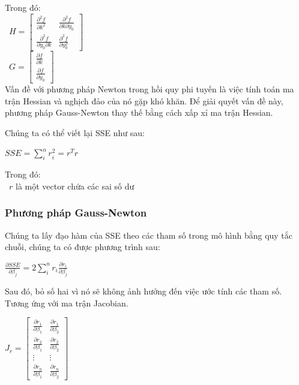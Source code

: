 \documentclass[conference]{IEEEtran}
\begin{document}
Trong đó: \\
\indent\textbullet\ \(H = \begin{bmatrix}
    \frac{\partial^2 f}{\partial k^2}            & \frac{\partial^2 f}{\partial k \partial y_0} \\
    \frac{\partial^2 f}{\partial y_0 \partial k} & \frac{\partial^2 f}{\partial y_0^2}
\end{bmatrix}\)\\
\indent\textbullet\ \(G = \begin{bmatrix}
    \frac{\partial f}{\partial k} \\ \frac{\partial f}{\partial y_0}
\end{bmatrix}\)\\

Vấn đề với phương pháp Newton trong hồi quy phi tuyến là việc tính toán ma trận Hessian và nghịch đảo của nó gặp khó khăn. Để giải quyết vấn đề này, phương pháp Gauss-Newton thay thế bằng cách xấp xỉ ma trận Hessian.

Chúng ta có thể viết lại SSE như sau:
\begin{center}
    $SSE = \sum_{i}^{n}r_i^2 = r^T r$
\end{center}

Trong đó: \\
\indent\textbullet\ \(r\) là một vector chứa các sai số dư \\

\subsubsection{Phương pháp Gauss-Newton}
Chúng ta lấy đạo hàm của SSE theo các tham số trong mô hình bằng quy tắc chuỗi, chúng ta có được phương trình sau:
\begin{center}
    \(
    \frac{\partial SSE}{\partial \beta_j} = 2\sum_{i}^{n} r_i \frac{\partial r_i}{\partial \beta_j}
    \)
\end{center}

Sau đó, bỏ số hai vì nó sẽ không ảnh hưởng đến việc ước tính các tham số. Tương ứng với ma trận Jacobian.

\begin{center}
    \(
    J_r = \begin{bmatrix}
        \frac{\partial r_1}{\partial \beta_1} & \frac{\partial r_1}{\partial \beta_2} \\
        \frac{\partial r_2}{\partial \beta_1} & \frac{\partial r_2}{\partial \beta_2} \\
        \vdots                                & \vdots                                \\
        \frac{\partial r_n}{\partial \beta_1} & \frac{\partial r_n}{\partial \beta_2}
    \end{bmatrix}
    \)
\end{center}
\end{document}
